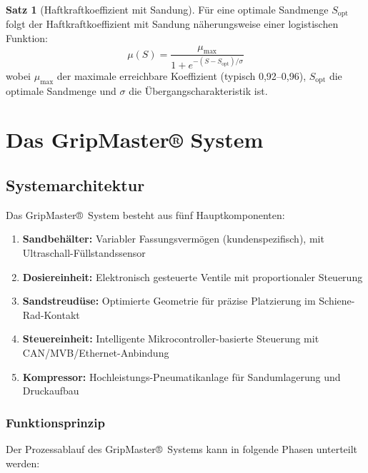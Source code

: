 \documentclass[a4paper,12pt]{article}
\theoremstyle{definition}
\newtheorem{satz}{Satz}
\begin{document}
\begin{satz}[Haftkraftkoeffizient mit Sandung]
	Für eine optimale Sandmenge $S_{\text{opt}}$ folgt der Haftkraftkoeffizient mit Sandung näherungsweise einer logistischen Funktion:
	\[
	\mu(S) = \frac{\mu_{\max}}{1 + e^{-(S-S_{\text{opt}})/\sigma}} 
	\]
	wobei $\mu_{\max}$ der maximale erreichbare Koeffizient (typisch 0,92--0,96), $S_{\text{opt}}$ die optimale Sandmenge und $\sigma$ die Übergangscharakteristik ist.
\end{satz}

\section{Das GripMaster® System}

\subsection{Systemarchitektur}

Das GripMaster®~System besteht aus fünf Hauptkomponenten:

\begin{enumerate}
	\item \textbf{Sandbehälter:} Variabler Fassungsvermögen (kundenspezifisch), mit Ultraschall-Füllstandssensor
	\item \textbf{Dosiereinheit:} Elektronisch gesteuerte Ventile mit proportionaler Steuerung
	\item \textbf{Sandstreudüse:} Optimierte Geometrie für präzise Platzierung im Schiene-Rad-Kontakt
	\item \textbf{Steuereinheit:} Intelligente Mikrocontroller-basierte Steuerung mit CAN/MVB/Ethernet-Anbindung
	\item \textbf{Kompressor:} Hochleistungs-Pneumatikanlage für Sandumlagerung und Druckaufbau
\end{enumerate}

\subsubsection{Funktionsprinzip}

Der Prozessablauf des GripMaster®~Systems kann in folgende Phasen unterteilt werden:
\end{document}
